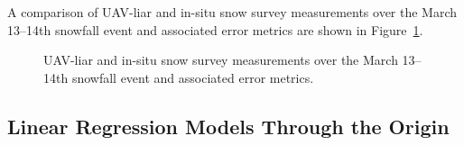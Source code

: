 \documentclass[
  letterpaper,
  DIV=11,
  numbers=noendperiod]{scrartcl}
\begin{document}
A comparison of UAV-liar and in-situ snow survey measurements over the
March 13--14th snowfall event and associated error metrics are shown in
Figure~\ref{fig-lidar-vs-fsd-sd}.

\begin{figure}


\caption{\label{fig-lidar-vs-fsd-sd}UAV-liar and in-situ snow survey
measurements over the March 13--14th snowfall event and associated error
metrics.}

\end{figure}%

\subsection{Linear Regression Models Through the
Origin}\label{linear-regression-models-through-the-origin}
\end{document}
